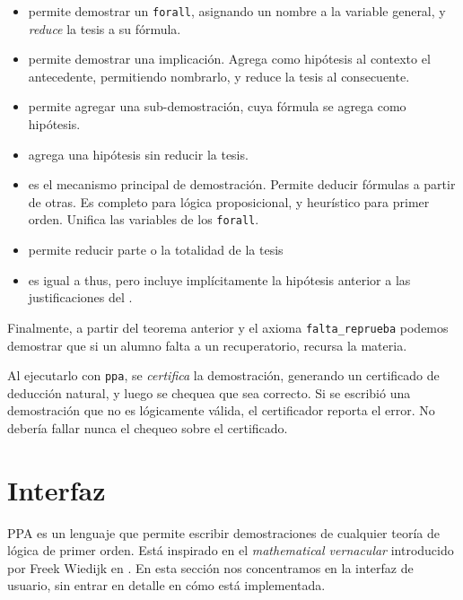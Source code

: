 \begin{itemize}
    \item \cmdLet{} permite demostrar un \lstinline{forall}, asignando un nombre
    a la variable general, y \textit{reduce} la tesis a su fórmula.
    \item \cmdSuppose{} permite demostrar una implicación. Agrega como
    hipótesis al contexto el antecedente, permitiendo nombrarlo, y reduce la
    tesis al consecuente.
    \item \cmdClaim{} permite agregar una sub-demostración, cuya fórmula se
    agrega como hipótesis.
    \item \cmdHave{} agrega una hipótesis sin reducir la tesis.
    \item \cmdBy{} es el mecanismo principal de demostración. Permite deducir
    fórmulas a partir de otras. Es completo para lógica proposicional, y
    heurístico para primer orden. Unifica las variables de los \lstinline{forall}.
    \item \cmdThus{} permite reducir parte o la totalidad de la tesis
    \item \cmdHence{} es igual a thus, pero incluye implícitamente la
    hipótesis anterior a las justificaciones del \cmdBy{}.
\end{itemize}

Finalmente, a partir del teorema anterior y el axioma \lstinline{falta_reprueba}
podemos demostrar que si un alumno falta a un recuperatorio, recursa la materia.

\begin{figure}[H]
    
\end{figure}

Al ejecutarlo con \texttt{ppa}, se \textit{certifica} la demostración, generando
un certificado de deducción natural, y luego se chequea que sea correcto. Si se
escribió una demostración que no es lógicamente válida, el certificador reporta
el error. No debería fallar nunca el chequeo sobre el certificado.

\section{Interfaz}

PPA es un lenguaje que permite escribir demostraciones de cualquier teoría de
lógica de primer orden. Está inspirado en el \textit{mathematical vernacular}
introducido por Freek Wiedijk en \cite{freek-mv}. En esta sección nos
concentramos en la interfaz de usuario, sin entrar en detalle en cómo está
implementada.

